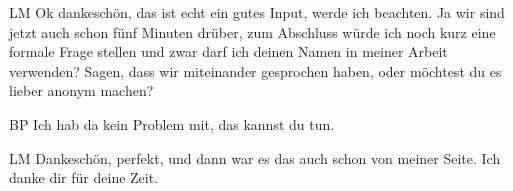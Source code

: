 \begin{xlist}
    \item[LM] Ok dankeschön, das ist echt ein gutes Input, werde ich beachten. Ja wir sind jetzt auch schon fünf Minuten drüber, zum Abschluss würde ich noch kurz eine formale Frage stellen und zwar darf ich deinen Namen in meiner Arbeit verwenden? Sagen, dass wir miteinander gesprochen haben, oder möchtest du es lieber anonym machen?
    \item[BP] Ich hab da kein Problem mit, das kannst du tun.
    \item[LM] Dankeschön, perfekt, und dann war es das auch schon von meiner Seite. Ich danke dir für deine Zeit. 
\end{xlist}



 \label{anhang:QualitativeContentAnalysis}

